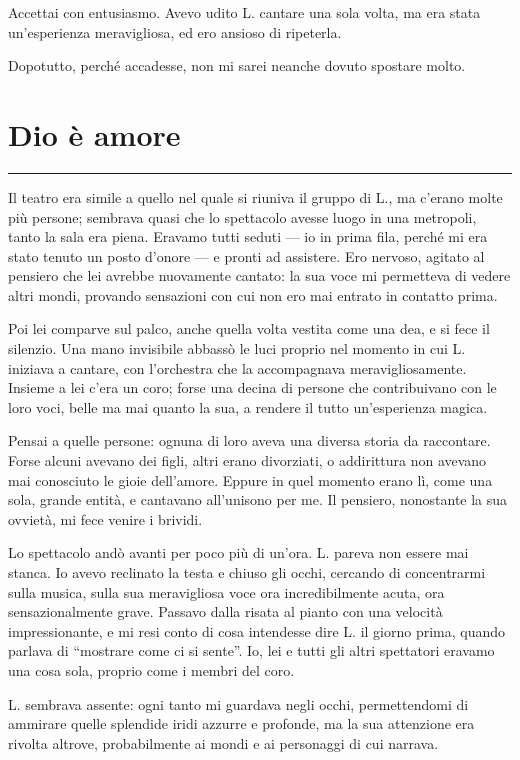 \documentclass[a4paper,11pt,oneside,openright,final]{memoir}
\begin{document}
Accettai con entusiasmo. Avevo udito L. cantare una sola volta, ma era stata
un'esperienza meravigliosa, ed ero ansioso di ripeterla.

Dopotutto, perché accadesse, non mi sarei neanche dovuto spostare molto.

\chapter{Dio è amore}

\plainbreak{1}

Il teatro era simile a quello nel quale si riuniva il gruppo di L., ma c'erano
molte più persone; sembrava quasi che lo spettacolo avesse luogo in una
metropoli, tanto la sala era piena. Eravamo tutti seduti --- io in prima fila,
perché mi era stato tenuto un posto d'onore --- e pronti ad assistere. Ero
nervoso, agitato al pensiero che lei avrebbe nuovamente cantato: la sua voce mi
permetteva di vedere altri mondi, provando sensazioni con cui non ero mai
entrato in contatto prima.

Poi lei comparve sul palco, anche quella volta vestita come una dea, e si fece
il silenzio. Una mano invisibile abbassò le luci proprio nel momento in cui L.
iniziava a cantare, con l'orchestra che la accompagnava meravigliosamente.
Insieme a lei c'era un coro; forse una decina di persone che contribuivano con
le loro voci, belle ma mai quanto la sua, a rendere il tutto un'esperienza
magica.

Pensai a quelle persone: ognuna di loro aveva una diversa storia da raccontare.
Forse alcuni avevano dei figli, altri erano divorziati, o addirittura non
avevano mai conosciuto le gioie dell'amore. Eppure in quel momento erano lì,
come una sola, grande entità, e cantavano all'unisono per me. Il pensiero,
nonostante la sua ovvietà, mi fece venire i brividi.

Lo spettacolo andò avanti per poco più di un'ora. L. pareva non essere mai
stanca. Io avevo reclinato la testa e chiuso gli occhi, cercando di concentrarmi
sulla musica, sulla sua meravigliosa voce ora incredibilmente acuta, ora
sensazionalmente grave. Passavo dalla risata al pianto con una velocità
impressionante, e mi resi conto di cosa intendesse dire L. il giorno prima,
quando parlava di ``mostrare come ci si sente''. Io, lei e tutti gli altri
spettatori eravamo una cosa sola, proprio come i membri del coro.

L. sembrava assente: ogni tanto mi guardava negli occhi, permettendomi di
ammirare quelle splendide iridi azzurre e profonde, ma la sua attenzione era
rivolta altrove, probabilmente ai mondi e ai personaggi di cui narrava.
\end{document}
